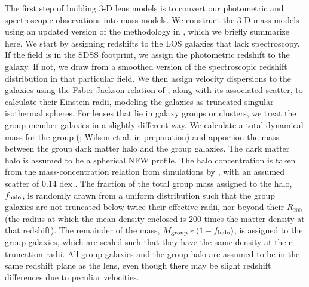 The first step of building 3-D lens models is to convert our photometric and spectroscopic observations into mass models. We construct the 3-D mass models using an updated version of the methodology in \citet{Wong11}, which we briefly summarize here.  We start by assigning redshifts to the LOS galaxies that lack spectroscopy. If the field is in the SDSS footprint, we assign the photometric redshift to the galaxy. If not, we draw from a smoothed version of the spectroscopic redshift distribution in that particular field.  We then assign velocity dispersions to the galaxies using the Faber-Jackson relation of \citet{Bernardi03}, along with its associated scatter, to calculate their Einstein radii, modeling the galaxies as truncated singular isothermal spheres.  For lenses that lie in galaxy groups or clusters, we treat the group member galaxies in a slightly different way.  We calculate a total dynamical mass for the group (\citealt{Momcheva06}; Wilson et al. in preparation) and apportion the mass between the group dark matter halo and the group galaxies.  The dark matter halo is assumed to be a spherical NFW profile.  The halo concentration is taken from the mass-concentration relation from simulations by \citet{Zhao09}, with an assumed scatter of 0.14 dex \citep{Bullock01}.  The fraction of the total group mass assigned to the halo, $f_{\rm{halo}}$, is randomly drawn from a uniform distribution such that the group galaxies are not truncated below twice their effective radii, nor beyond their $R_{200}$ (the radius at which the mean density enclosed is 200 times the matter density at that redshift).  The remainder of the mass, $M_{\rm{group}}*(1-f_{\rm{halo}})$, is assigned to the group galaxies, which are scaled such that they have the same density at their truncation radii.  All group galaxies and the group halo are assumed to be in the same redshift plane as the lens, even though there may be slight redshift differences due to peculiar velocities.